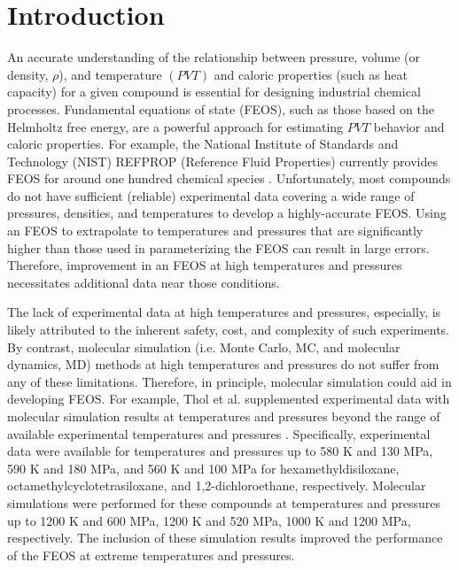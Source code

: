 \documentclass[journal=jctc,manuscript=article]{achemso}
\begin{document}
\section{Introduction}

An accurate understanding of the relationship between pressure, volume (or density, $\rho$), and temperature $(PVT)$ and caloric properties (such as heat capacity) for a given compound is essential for designing industrial chemical processes. Fundamental equations of state (FEOS), such as those based on the Helmholtz free energy, are a powerful approach for estimating $PVT$ behavior and caloric properties. For example, the National Institute of Standards and Technology (NIST) REFPROP (Reference Fluid Properties) currently provides FEOS for around one hundred chemical species \cite{LEMMON-RP91}. Unfortunately, most compounds do not have sufficient (reliable) experimental data covering a wide range of pressures, densities, and temperatures to develop a highly-accurate FEOS. Using an FEOS to extrapolate to temperatures and pressures that are significantly higher than those used in parameterizing the FEOS can result in large errors. Therefore, improvement in an FEOS at high temperatures and pressures necessitates additional data near those conditions.

The lack of experimental data at high temperatures and pressures, especially, is likely attributed to the inherent safety, cost, and complexity of such experiments. By contrast, molecular simulation (i.e. Monte Carlo, MC, and molecular dynamics, MD) methods at high temperatures and pressures do not suffer from any of these limitations. Therefore, in principle, molecular simulation could aid in developing FEOS. For example, Thol et al. supplemented experimental data with molecular simulation results at temperatures and pressures beyond the range of available experimental temperatures and pressures \cite{Thol2016_siloxane_first,Thol2016_siloxane,Thol2017}. Specifically, experimental data were available for temperatures and pressures up to 580 K and 130 MPa, 590 K and 180 MPa, and 560 K and 100 MPa for hexamethyldisiloxane, octamethylcyclotetrasiloxane, and 1,2-dichloroethane, respectively. Molecular simulations were performed for these compounds at temperatures and pressures up to 1200 K and 600 MPa, 1200 K and 520 MPa, 1000 K and 1200 MPa, respectively. The inclusion of these simulation results improved the performance of the FEOS at extreme temperatures and pressures. 
\end{document}
